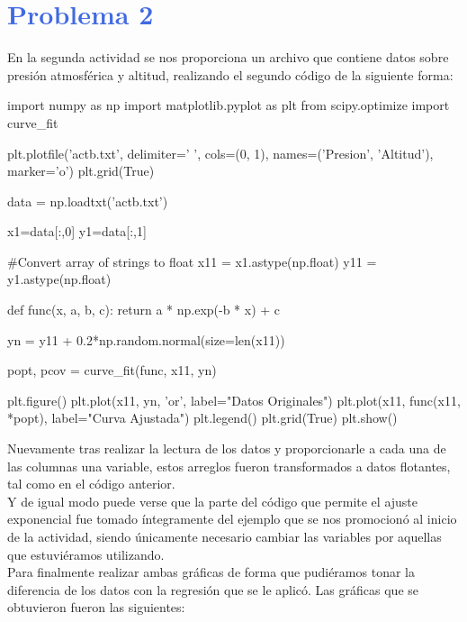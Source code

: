 \documentclass[12pt]{article}
\begin{document}
\section*{\textcolor{RoyalBlue}{Problema 2}}
En la segunda actividad se nos proporciona un archivo que contiene datos sobre presión atmosférica y altitud, realizando el segundo código de la siguiente forma:
\begin{center}
\begin{boxedverbatim}
import numpy as np
import matplotlib.pyplot as plt
from scipy.optimize import curve_fit

plt.plotfile('actb.txt', delimiter=' ', cols=(0, 1), 
             names=('Presion', 'Altitud'), marker='o')
plt.grid(True)

data = np.loadtxt('actb.txt')

x1=data[:,0] 
y1=data[:,1] 


#‎Convert‬ array of strings to float
x11 = x1.astype(np.float)
y11 = y1.astype(np.float)

def func(x, a, b, c):
    return a * np.exp(-b * x) + c


yn = y11 + 0.2*np.random.normal(size=len(x11))

popt, pcov = curve_fit(func, x11, yn)

plt.figure()
plt.plot(x11, yn, 'or', label="Datos Originales")
plt.plot(x11, func(x11, *popt), label="Curva Ajustada")
plt.legend()
plt.grid(True)
plt.show()
\end{boxedverbatim}
\end{center}
Nuevamente tras realizar la lectura de los datos y proporcionarle a cada una de las columnas una variable, estos arreglos fueron transformados a datos flotantes, tal como en el código anterior.\\ 
Y de igual modo puede verse que la parte del código que permite el ajuste exponencial fue tomado íntegramente del ejemplo que se nos promocionó al inicio de la actividad, siendo únicamente necesario cambiar las variables por aquellas que estuviéramos utilizando.\\
Para finalmente realizar ambas gráficas de forma que pudiéramos tonar la diferencia de los datos con la regresión que se le aplicó. Las gráficas que se obtuvieron fueron las siguientes:
\end{document}
